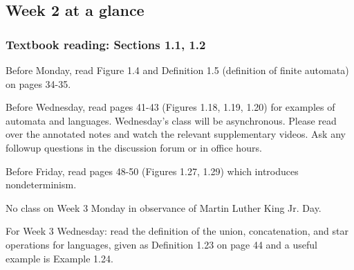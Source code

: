 

\subsection*{Week 2 at a glance}

\vspace{-15pt}

\subsubsection*{Textbook reading: Sections 1.1, 1.2}

\vspace{-15pt}

Before Monday, read Figure 1.4 and Definition 1.5 (definition of finite automata) on pages 34-35.

Before Wednesday, read pages 41-43 (Figures 1.18, 1.19, 1.20) for examples of automata and languages. Wednesday's class will be asynchronous. Please read over the annotated notes and watch the relevant supplementary videos. Ask any followup questions in the discussion forum or in office hours.

Before Friday, read pages 48-50 (Figures 1.27, 1.29) which introduces nondeterminism.

No class on Week 3 Monday in observance of Martin Luther King Jr. Day.

For Week 3 Wednesday: read the definition of the union, concatenation, and star operations for languages,  given 
as Definition 1.23 on page 44 and a useful example is Example 1.24.

\vspace{-20pt}

